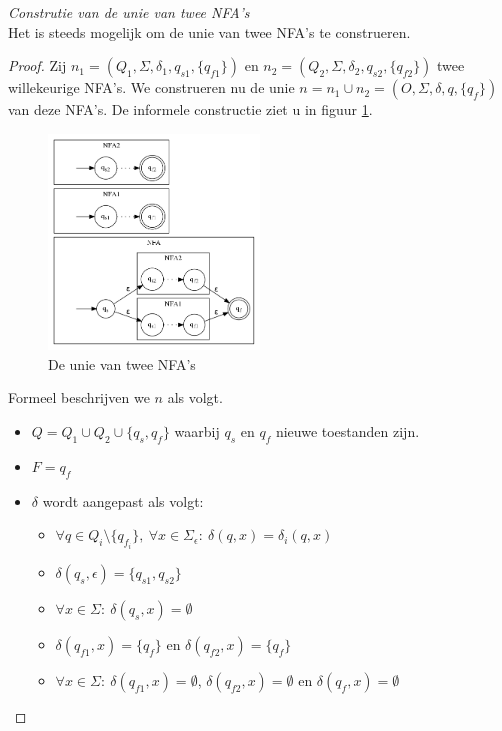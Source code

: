 \documentclass[main.tex]{subfiles}
\begin{document}
\begin{st}
  \emph{Construtie van de unie van twee NFA's}\\
  Het is steeds mogelijk om de unie van twee NFA's te construeren.

  \begin{proof}
    Zij $n_{1} = (Q_{1},\Sigma,\delta_{1},q_{s1},\{q_{f1}\})$ en $n_{2} = (Q_{2},\Sigma,\delta_{2},q_{s2},\{q_{f2}\})$ twee willekeurige NFA's. We construeren nu de unie $n = n_{1} \cup n_{2} = (O,\Sigma,\delta,q,\{q_{f}\})$ van deze NFA's.
    De informele constructie ziet u in figuur \ref{fig:nfa_unie}.
    \begin{figure}[H]
      \centering
      \includegraphics[width=0.5\textwidth]{assets/nfa_unie.png}      
      \caption{De unie van twee NFA's}
      \label{fig:nfa_unie}
    \end{figure}
    Formeel beschrijven we $n$ als volgt.
    \begin{itemize}
    \item $Q = Q_{1} \cup Q_{2} \cup \{ q_{s}, q_{f} \}$ waarbij $q_{s}$ en $q_{f}$ nieuwe toestanden zijn.
    \item $F = {q_{f}}$
    \item $\delta$ wordt aangepast als volgt:
      \begin{itemize}
      \item $\forall q \in Q_{i}\setminus\{q_{f_{i}}\},\ \forall x \in \Sigma_{\epsilon}:\ \delta(q,x) = \delta_{i}(q,x)$
      \item $\delta(q_{s},\epsilon) = \{q_{s1},q_{s2}\}$
      \item $\forall x \in \Sigma:\ \delta(q_{s},x) = \emptyset$
      \item $\delta(q_{f1},x) = \{q_{f}\}$ en $\delta(q_{f2},x) = \{q_{f}\}$
      \item $\forall x \in \Sigma:\ \delta(q_{f1},x) = \emptyset$, $\delta(q_{f2},x) = \emptyset$ en $\delta(q_{f},x) = \emptyset$ 
      \end{itemize}
    \end{itemize}
  \end{proof}
\end{st}
\end{document}
